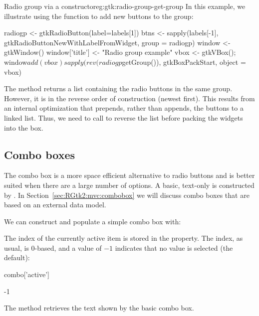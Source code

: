 \begin{example}{Radio group via a 
    constructor}{eg:gtk:radio-group-get-group}
  In this example, we illustrate using the
   function to add
  new buttons to the group:
\begin{Schunk}
\begin{Sinput}
 radiogp <- gtkRadioButton(label=labels[1])
 btns <- sapply(labels[-1], gtkRadioButtonNewWithLabelFromWidget, 
                group = radiogp)
 window <- gtkWindow()
 window['title'] <- "Radio group example"
 vbox <- gtkVBox(); window$add(vbox)
 sapply(rev(radiogp$getGroup()), gtkBoxPackStart, object = vbox)
\end{Sinput}
\end{Schunk}
%
The  method returns a list containing
the radio buttons in the same group. However, it is in the reverse
order of construction (newest first). This results from an internal
optimization that prepends, rather than appends, the buttons to a
linked list. Thus, we need to call  to reverse the list
before packing the widgets into the box.

\end{example}

\subsection{Combo boxes}
\label{sec:RGtk2:basic-combobox}

The combo box is a more space efficient alternative to radio buttons
and is better suited when there are a large number of options. A
basic, text-only  is constructed by
. In
Section~\ref{sec:RGtk2:mvc:combobox} we will discuss combo boxes that
are based on an external data model.

We can construct and populate a simple combo box with:
\begin{Schunk}
\end{Schunk}
%

The index of the currently active item is stored in the
 property. The index, as usual, is $0$-based,
and a value of $-1$ indicates that no value is selected (the default):
\begin{Schunk}
\begin{Sinput}
 combo['active']
\end{Sinput}
\begin{Soutput}
[1] -1
\end{Soutput}
\end{Schunk}
%
The  method retrieves
the text shown by the basic combo box.


